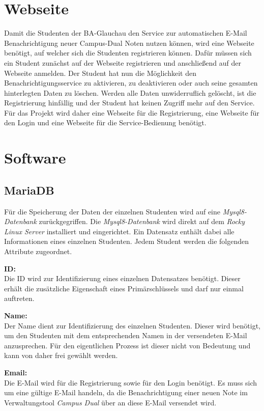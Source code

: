 \section{Webseite}
Damit die Studenten der BA-Glauchau den Service zur automatischen E-Mail Benachrichtigung neuer Campus-Dual Noten nutzen können, wird eine Webseite benötigt, auf welcher sich die Studenten registrieren können.
Dafür müssen sich ein Student zunächst auf der Webseite registrieren und anschließend auf der Webseite anmelden.
Der Student hat nun die Möglichkeit den Benachrichtigungsservice zu aktivieren, zu deaktivieren oder auch seine gesamten hinterlegten Daten zu löschen.
Werden alle Daten unwiderruflich gelöscht, ist die Registrierung hinfällig und der Student hat keinen Zugriff mehr auf den Service.
Für das Projekt wird daher eine Webseite für die Registrierung, eine Webseite für den Login und eine Webseite für die Service-Bedienung benötigt.

\section{Software}

\subsection{MariaDB}
Für die Speicherung der Daten der einzelnen Studenten wird auf eine \textit{Mysql8-Datenbank} zurückgegriffen.
Die \textit{Mysql8-Datenbank} wird direkt auf dem \textit{Rocky Linux Server} installiert und eingerichtet.
Ein Datensatz enthält dabei alle Informationen eines einzelnen Studenten.
Jedem Student werden die folgenden Attribute zugeordnet.

\textbf{ID:}\\
Die ID wird zur Identifizierung eines einzelnen Datensatzes benötigt.
Dieser erhält die zusätzliche Eigenschaft eines Primärschlüssels und darf nur einmal auftreten.

\textbf{Name:}\\
Der Name dient zur Identifizierung des einzelnen Studenten.
Dieser wird benötigt, um den Studenten mit dem entsprechenden Namen in der versendeten E-Mail anzusprechen.
Für den eigentlichen Prozess ist dieser nicht von Bedeutung und kann von daher frei gewählt werden.

\textbf{Email:}\\
Die E-Mail wird für die Registrierung sowie für den Login benötigt.
Es muss sich um eine gültige E-Mail handeln, da die Benachrichtigung einer neuen Note im Verwaltungstool \textit{Campus Dual} über an diese E-Mail versendet wird.

